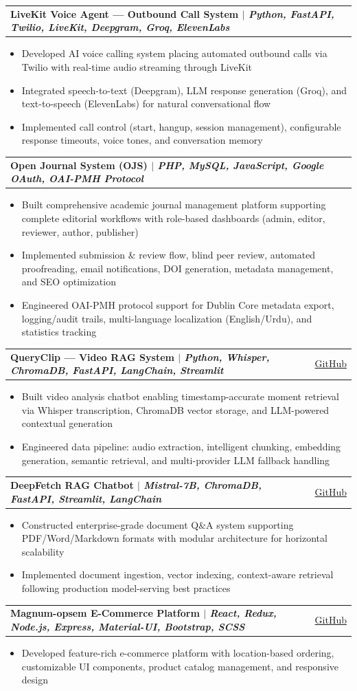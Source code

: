 \documentclass[letterpaper,10pt]{article}
\makeatletter
\newcommand{\resumeItem}[1]{\item\small{#1}}
\newcommand{\resumeProjectHeading}[2]{
    \vspace{-1pt}\item
    \begin{tabular*}{0.97\textwidth}{l@{\extracolsep{\fill}}r}
      \small\textbf{#1} & #2 \\
    \end{tabular*}\vspace{-5pt}
}
\newcommand{\resumeItemListStart}{\begin{itemize}[leftmargin=0.15in]}
\newcommand{\resumeItemListEnd}{\end{itemize}\vspace{-3pt}}
\makeatother
\begin{document}
\resumeProjectHeading
{\textbf{LiveKit Voice Agent — Outbound Call System} $|$ \emph{Python, FastAPI, Twilio, LiveKit, Deepgram, Groq, ElevenLabs}}{}
\resumeItemListStart
\resumeItem{Developed AI voice calling system placing automated outbound calls via Twilio with real-time audio streaming through LiveKit}
\resumeItem{Integrated speech-to-text (Deepgram), LLM response generation (Groq), and text-to-speech (ElevenLabs) for natural conversational flow}
\resumeItem{Implemented call control (start, hangup, session management), configurable response timeouts, voice tones, and conversation memory}
\resumeItemListEnd

\resumeProjectHeading
{\textbf{Open Journal System (OJS)} $|$ \emph{PHP, MySQL, JavaScript, Google OAuth, OAI-PMH Protocol}}{}
\resumeItemListStart
\resumeItem{Built comprehensive academic journal management platform supporting complete editorial workflows with role-based dashboards (admin, editor, reviewer, author, publisher)}
\resumeItem{Implemented submission \& review flow, blind peer review, automated proofreading, email notifications, DOI generation, metadata management, and SEO optimization}
\resumeItem{Engineered OAI-PMH protocol support for Dublin Core metadata export, logging/audit trails, multi-language localization (English/Urdu), and statistics tracking}
\resumeItemListEnd

\resumeProjectHeading
{\textbf{QueryClip — Video RAG System} $|$ \emph{Python, Whisper, ChromaDB, FastAPI, LangChain, Streamlit}}{\href{https://github.com/FawwazRaza/QueryClip}{GitHub}}
\resumeItemListStart
\resumeItem{Built video analysis chatbot enabling timestamp-accurate moment retrieval via Whisper transcription, ChromaDB vector storage, and LLM-powered contextual generation}
\resumeItem{Engineered data pipeline: audio extraction, intelligent chunking, embedding generation, semantic retrieval, and multi-provider LLM fallback handling}
\resumeItemListEnd

\resumeProjectHeading
{\textbf{DeepFetch RAG Chatbot} $|$ \emph{Mistral-7B, ChromaDB, FastAPI, Streamlit, LangChain}}{\href{https://github.com/FawwazRaza/DeepFetch_RAG_chatbot}{GitHub}}
\resumeItemListStart
\resumeItem{Constructed enterprise-grade document Q\&A system supporting PDF/Word/Markdown formats with modular architecture for horizontal scalability}
\resumeItem{Implemented document ingestion, vector indexing, context-aware retrieval following production model-serving best practices}
\resumeItemListEnd

\resumeProjectHeading
{\textbf{Magnum-opsem E-Commerce Platform} $|$ \emph{React, Redux, Node.js, Express, Material-UI, Bootstrap, SCSS}}{\href{https://github.com/FawwazRaza/magnum-opsem}{GitHub}}
\resumeItemListStart
\resumeItem{Developed feature-rich e-commerce platform with location-based ordering, customizable UI components, product catalog management, and responsive design}
\resumeItemListEnd
\end{document}
